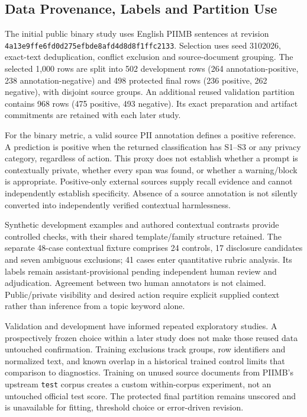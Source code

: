 \documentclass[conference]{IEEEtran}
\begin{document}
\subsection{Data Provenance, Labels and Partition Use}

The initial public binary study uses English PIIMB sentences at revision \texttt{4a13e9ffe6fd0d275efbde8afd4d8d8f1ffc2133}. Selection uses seed 3102026, exact-text deduplication, conflict exclusion and source-document grouping. The selected 1,000 rows are split into 502 development rows (264 annotation-positive, 238 annotation-negative) and 498 protected final rows (236 positive, 262 negative), with disjoint source groups. An additional reused validation partition contains 968 rows (475 positive, 493 negative). Its exact preparation and artifact commitments are retained with each later study.

For the binary metric, a valid source PII annotation defines a positive reference. A prediction is positive when the returned classification has S1--S3 or any privacy category, regardless of action. This proxy does not establish whether a prompt is contextually private, whether every span was found, or whether a warning/block is appropriate. Positive-only external sources supply recall evidence and cannot independently establish specificity. Absence of a source annotation is not silently converted into independently verified contextual harmlessness.

Synthetic development examples and authored contextual contrasts provide controlled checks, with their shared template/family structure retained. The separate 48-case contextual fixture comprises 24 controls, 17 disclosure candidates and seven ambiguous exclusions; 41 cases enter quantitative rubric analysis. Its labels remain assistant-provisional pending independent human review and adjudication. Agreement between two human annotators is not claimed. Public/private visibility and desired action require explicit supplied context rather than inference from a topic keyword alone.

Validation and development have informed repeated exploratory studies. A prospectively frozen choice within a later study does not make those reused data untouched confirmation. Training exclusions track groups, row identifiers and normalized text, and known overlap in a historical trained control limits that comparison to diagnostics. Training on unused source documents from PIIMB's upstream \texttt{test} corpus creates a custom within-corpus experiment, not an untouched official test score. The protected final partition remains unscored and is unavailable for fitting, threshold choice or error-driven revision.
\end{document}
